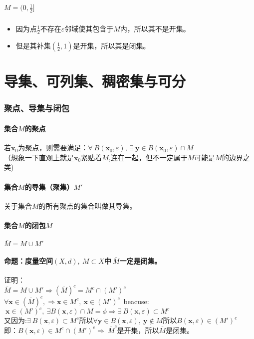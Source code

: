 \documentclass[11pt]{article}
\begin{document}
\begin{CJK*}{UTF8}{gbsn}
\subsubsection{$M=(0,\frac{1}{2}]$}
\begin{itemize}
	\item 因为点$\frac{1}{2}$不存在$\varepsilon$邻域使其包含于$M$内，所以其不是开集。
	\item 但是其补集$(\frac{1}{2},1)$是开集，所以其是闭集。
\end{itemize}
\pagebreak
\part{导集、可列集、稠密集与可分}
\setcounter{section}{0}
\section{聚点、导集与闭包}
\subsection{集合$M$的聚点}
若$\bm x_0$为聚点，则需要满足：$\forall~B(\bm x_0,\varepsilon ),~\exists~\bm y \in B(\bm x_0,\varepsilon )\cap M$\\
（想象一下直观上就是$\bm x_0$紧贴着$M$,连在一起，但不一定属于$M$可能是$M$的边界之类)
\subsection{集合$M$的导集（聚集）$M'$}
关于集合$M$的所有聚点的集合叫做其导集。\\

\subsection{集合$M$的闭包$\overline{M}$}
$\overline{M}=M\cup M'$

\subsection{命题：度量空间$(X,d),~M\subset X$中$~\overline{M}$一定是闭集。}
证明：\\
$\overline{M}=M\cup M'\Rightarrow (\overline{M})^c=M^c\cap {(M')}^c$\\
$\forall \bm x\in (\overline{M})^c,\Rightarrow \bm x\in M^c,~\bm x \in {(M')}^c$~beacuse:$~\bm x \in {(M')}^c,~\exists B(\bm x,\varepsilon  )\cap M=\phi\Rightarrow \exists ~B(\bm x,\varepsilon  )\subset M^c$\\
又因为:$\exists ~B(\bm x,\varepsilon  )\subset M^c$所以$\forall \bm y \in B(\bm x,\varepsilon  ),~\bm y\notin M$所以$B(\bm x,\varepsilon  )\in {(M')}^c$\\
即：$B(\bm x,\varepsilon  )\in M^c\cap {(M')}^c\Rightarrow ~\overline{M}^c$是开集，所以$\overline{M}$是闭集。


\end{CJK*}
\end{document}
